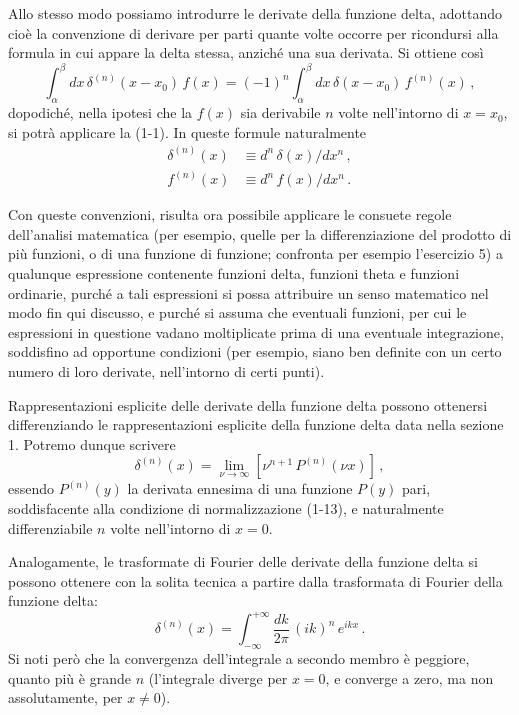 \documentclass[11pt, a4paper]{book}
\numberwithin{equation}{section}
\begin{document}
Allo stesso modo possiamo introdurre le derivate della funzione delta, adottando cioè la convenzione di derivare per parti quante volte occorre per ricondursi alla formula in cui appare la delta stessa, anziché una sua derivata. Si ottiene così
\begin{equation}
\int_{\alpha}^{\beta} dx\, \delta^{(n)}(x - x_0)\, f(x) = (-1)^n \int_{\alpha}^{\beta} dx\, \delta(x - x_0)\, f^{(n)}(x) \,, \tag{4}
\end{equation}
dopodiché, nella ipotesi che la $f(x)$ sia derivabile $n$ volte nell'intorno di $x = x_0$, si potrà applicare la (1-1). In queste formule naturalmente
\begin{align}
\delta^{(n)}(x) &\equiv d^n\, \delta(x) / dx^n \,, \tag{5a} \\
f^{(n)}(x) &\equiv d^n\, f(x) / dx^n \,. \tag{5b}
\end{align}

Con queste convenzioni, risulta ora possibile applicare le consuete regole dell'analisi matematica (per esempio, quelle per la differenziazione del prodotto di più funzioni, o di una funzione di funzione; confronta per esempio l'esercizio 5) a qualunque espressione contenente funzioni delta, funzioni theta e funzioni ordinarie, purché a tali espressioni si possa attribuire un senso matematico nel modo fin qui discusso, e purché si assuma che eventuali funzioni, per cui le espressioni in questione vadano moltiplicate prima di una eventuale integrazione, soddisfino ad opportune condizioni (per esempio, siano ben definite con un certo numero di loro derivate, nell'intorno di certi punti).

Rappresentazioni esplicite delle derivate della funzione delta possono ottenersi differenziando le rappresentazioni esplicite della funzione delta data nella sezione 1. Potremo dunque scrivere
\begin{equation}
\delta^{(n)}(x) = \lim_{\nu \to \infty} \left[\nu^{n+1}\, P^{(n)}(\nu x)\right] \,, \tag{6}
\end{equation}
essendo $P^{(n)}(y)$ la derivata ennesima di una funzione $P(y)$ pari, soddisfacente alla condizione di normalizzazione (1-13), e naturalmente differenziabile $n$ volte nell'intorno di $x=0$.

Analogamente, le trasformate di Fourier delle derivate della funzione delta si possono ottenere con la solita tecnica a partire dalla trasformata di Fourier della funzione delta:
\begin{equation}
\delta^{(n)}(x) = \int_{-\infty}^{+\infty} \frac{dk}{2\pi}\, (ik)^n\, e^{ikx} \,. \tag{7}
\end{equation}
Si noti però che la convergenza dell'integrale a secondo membro è peggiore, quanto più è grande $n$ (l'integrale diverge per $x=0$, e converge a zero, ma non assolutamente, per $x \neq 0$).
\end{document}
